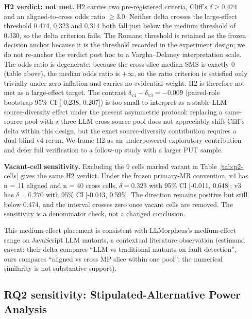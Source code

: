 \documentclass[manuscript,screen,review]{acmart}
\begin{document}
\textbf{H2 verdict: not met.} H2 carries two pre-registered criteria,
Cliff's $\delta \geq 0.474$ and an aligned-to-cross odds ratio
$\geq 3.0$. Neither delta crosses the \citet{romano2006cliff}
large-effect threshold 0.474, 0.323 and 0.314 both fall just below the
\citet{romano2006cliff} medium threshold of 0.330, so the delta criterion fails. The
Romano threshold is retained as the frozen decision anchor because it is
the threshold recorded in the experiment design; we do not re-anchor the
verdict post hoc to a Vargha--Delaney interpretation scale. The
odds ratio is degenerate: because the cross-slice median SMS is exactly
0 (table above), the median odds ratio is $+\infty$, so the ratio
criterion is satisfied only trivially under zero-inflation and carries no
evidential weight. H2 is therefore not met as a large-effect target. The
contrast $\delta_{\mathrm{v4}} - \delta_{\mathrm{v3}} = -0.009$ (paired-role
bootstrap 95\% CI {[}-0.238, 0.207{]}) is too small to interpret as a stable LLM-source-diversity effect
under the present asymmetric protocol: replacing a same-source pool with
a three-LLM cross-source pool does not appreciably shift Cliff's delta
within this design, but the exact source-diversity contribution requires
a dual-blind v4 rerun. We frame H2 as an underpowered exploratory
contribution and defer full verification to a follow-up study with a
larger PUT sample.

\textbf{Vacant-cell sensitivity.} Excluding the 9 cells marked vacant in
Table~\ref{tab:p2-cells} gives the same H2 verdict. Under the frozen
primary-MR convention, v4 has n = 11 aligned and n = 40 cross cells,
$\delta = 0.323$ with 95\% CI {[}-0.011, 0.648{]}; v3 has
$\delta = 0.270$ with 95\% CI {[}-0.043, 0.595{]}. The direction remains
positive but still below 0.474, and the interval crosses zero once vacant
cells are removed. The sensitivity is a denominator check, not a changed
conclusion.

This medium-effect placement is consistent with \citet{tip2025llmorpheus}
LLMorpheus's medium-effect range on JavaScript LLM mutants, a contextual
literature observation (estimand caveat: their delta compares ``LLM vs
traditional mutants on fault detection'', ours compares ``aligned vs
cross MP slice within one pool''; the numerical similarity is not
substantive support).

\subsection{RQ2 sensitivity: Stipulated-Alternative Power Analysis}\label{rq2-stipulated-alternative-power}
\end{document}
